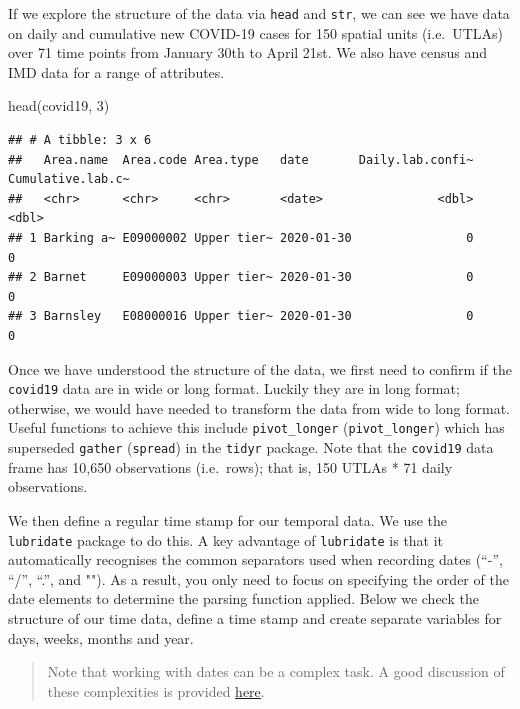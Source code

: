 \documentclass[
]{book}
\newenvironment{Shaded}{\begin{snugshade}}{\end{snugshade}}
\newcommand{\DecValTok}[1]{\textcolor[rgb]{0.00,0.00,0.81}{#1}}
\newcommand{\FunctionTok}[1]{\textcolor[rgb]{0.00,0.00,0.00}{#1}}
\newcommand{\NormalTok}[1]{#1}
\begin{document}
If we explore the structure of the data via \texttt{head} and \texttt{str}, we can see we have data on daily and cumulative new COVID-19 cases for 150 spatial units (i.e.~UTLAs) over 71 time points from January 30th to April 21st. We also have census and IMD data for a range of attributes.

\begin{Shaded}
\begin{Highlighting}[]
\FunctionTok{head}\NormalTok{(covid19, }\DecValTok{3}\NormalTok{)}
\end{Highlighting}
\end{Shaded}

\begin{verbatim}
## # A tibble: 3 x 6
##   Area.name  Area.code Area.type   date       Daily.lab.confi~ Cumulative.lab.c~
##   <chr>      <chr>     <chr>       <date>                <dbl>             <dbl>
## 1 Barking a~ E09000002 Upper tier~ 2020-01-30                0                 0
## 2 Barnet     E09000003 Upper tier~ 2020-01-30                0                 0
## 3 Barnsley   E08000016 Upper tier~ 2020-01-30                0                 0
\end{verbatim}

Once we have understood the structure of the data, we first need to confirm if the \texttt{covid19} data are in wide or long format. Luckily they are in long format; otherwise, we would have needed to transform the data from wide to long format. Useful functions to achieve this include \texttt{pivot\_longer} (\texttt{pivot\_longer}) which has superseded \texttt{gather} (\texttt{spread}) in the \texttt{tidyr} package. Note that the \texttt{covid19} data frame has 10,650 observations (i.e.~rows); that is, 150 UTLAs * 71 daily observations.

We then define a regular time stamp for our temporal data. We use the \texttt{lubridate} package to do this. A key advantage of \texttt{lubridate} is that it automatically recognises the common separators used when recording dates (``-'', ``/'', ``.'', and ""). As a result, you only need to focus on specifying the order of the date elements to determine the parsing function applied. Below we check the structure of our time data, define a time stamp and create separate variables for days, weeks, months and year.

\begin{quote}
Note that working with dates can be a complex task. A good discussion of these complexities is provided \href{http://uc-r.github.io/dates/\#convert_date}{here}.
\end{quote}
\end{document}
